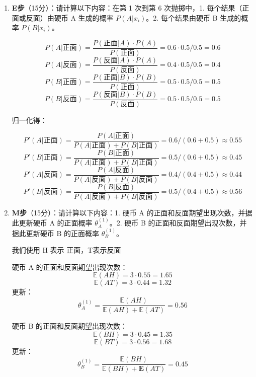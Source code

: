 \documentclass[8pt]{article}
\begin{document}
\begin{enumerate}
    \item \textbf{E步}（15分）：请计算以下内容：在第 1 次到第 6 次抛掷中，1. 每个结果（正面或反面）由硬币 A 生成的概率 \( P(A | x_i) \)。2. 每个结果由硬币 B 生成的概率 \( P(B | x_i) \)。

    \[
    P(A|\text{正面}) = \frac{P(\text{正面}|A) \cdot P(A)}{P(\text{正面})}
    =0.6 \cdot 0.5 / 0.5 = 0.6
    \]
    \[
    P(A|\text{反面}) = \frac{P(\text{反面}|A) \cdot P(A)}{P(\text{反面})}
    =0.4 \cdot 0.5 / 0.5 = 0.4
    \]
    \[
    P(B|\text{正面}) = \frac{P(\text{正面}|B) \cdot P(B)}{P(\text{正面})}
    =0.5 \cdot 0.5 / 0.5 = 0.5
    \]
    \[
    P(B|\text{反面}) = \frac{P(\text{反面}|B) \cdot P(B)}{P(\text{反面})}
    =0.5 \cdot 0.5 / 0.5 = 0.5
    \]

    {\color{blue}归一化得：}

    \[
    P'(A|\text{正面}) = \frac{P(A|\text{正面})}{P(A|\text{正面})+P(B|\text{正面})}
    =0.6 / (0.6 + 0.5) \approx 0.55
    \]
    \[
    P'(B|\text{正面}) = \frac{P(B|\text{正面})}{P(A|\text{正面})+P(B|\text{正面})}
    =0.5 / (0.6 + 0.5) \approx 0.45
    \]
    \[
    P'(A|\text{反面}) = \frac{P(A|\text{反面})}{P(A|\text{反面})+P(B|\text{反面})}
    =0.4 / (0.4 + 0.5) \approx 0.44
    \]
    \[
    P'(B|\text{反面}) = \frac{P(B|\text{反面})}{P(A|\text{反面})+P(B|\text{反面})}
    =0.5 / (0.4 + 0.5) \approx 0.56
    \]

    \item \textbf{M步}（15分）：请计算以下内容：1. 硬币 A 的正面和反面期望出现次数，并据此更新硬币 A 的正面概率 \( \theta_A^{(1)} \)。2. 硬币 B 的正面和反面期望出现次数，并据此更新硬币 B 的正面概率 \( \theta_B^{(1)} \)。

{\color{blue}我们使用 H 表示 正面，T表示反面}

硬币 A 的正面和反面期望出现次数：
\[\mathbb{E}(AH) = 3 \cdot 0.55 = 1.65 \]
\[\mathbb{E}(AT) = 3 \cdot 0.44 = 1.32 \]
更新：\[\theta_A^{(1)} = \frac{\mathbb{E}(AH)}{\mathbb{E}(AH) + \mathbb{E}(AT)} = 0.56 \]


硬币 B 的正面和反面期望出现次数：
\[\mathbb{E}(BH) = 3 \cdot 0.45 = 1.35 \]
\[\mathbb{E}(BT) = 3 \cdot 0.56 = 1.68 \]
更新：\[\theta_B^{(1)} = \frac{\mathbb{E}(BH)}{\mathbb{E}(BH) + \mathbf{E}(AT)} = 0.45 \]

\end{enumerate}
\end{document}
